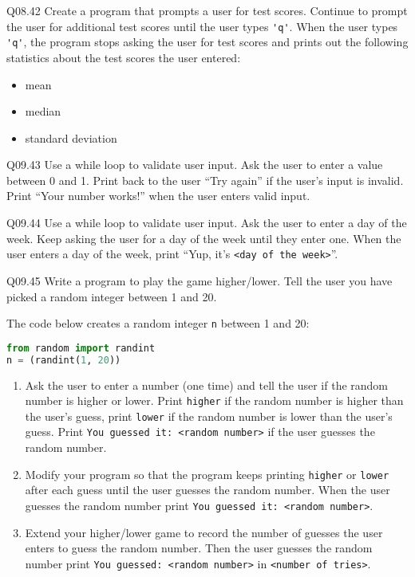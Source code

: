 \documentclass{book}
\providecommand{\tightlist}{%
      \setlength{\itemsep}{0pt}\setlength{\parskip}{0pt}}
\newcommand{\passthrough}[1]{#1}
\begin{document}
Q08.42 Create a program that prompts a user for test scores. Continue to
prompt the user for additional test scores until the user types
\passthrough{\lstinline!'q'!}. When the user types
\passthrough{\lstinline!'q'!}, the program stops asking the user for
test scores and prints out the following statistics about the test
scores the user entered:

\begin{itemize}
\tightlist
\item
  mean
\item
  median
\item
  standard deviation
\end{itemize}

Q09.43 Use a while loop to validate user input. Ask the user to enter a
value between 0 and 1. Print back to the user ``Try again'' if the
user's input is invalid. Print ``Your number works!'' when the user
enters valid input.

Q09.44 Use a while loop to validate user input. Ask the user to enter a
day of the week. Keep asking the user for a day of the week until they
enter one. When the user enters a day of the week, print ``Yup, it's
\passthrough{\lstinline!<day of the week>!}''.

Q09.45 Write a program to play the game higher/lower. Tell the user you
have picked a random integer between 1 and 20.

The code below creates a random integer \passthrough{\lstinline!n!}
between 1 and 20:

\begin{lstlisting}[language=Python]
from random import randint
n = (randint(1, 20))
\end{lstlisting}

\begin{enumerate}
\def\labelenumi{(\alph{enumi})}
\item
  Ask the user to enter a number (one time) and tell the user if the
  random number is higher or lower. Print
  \passthrough{\lstinline!higher!} if the random number is higher than
  the user's guess, print \passthrough{\lstinline!lower!} if the random
  number is lower than the user's guess. Print
  \passthrough{\lstinline!You guessed it: <random number>!} if the user
  guesses the random number.
\item
  Modify your program so that the program keeps printing
  \passthrough{\lstinline!higher!} or \passthrough{\lstinline!lower!}
  after each guess until the user guesses the random number. When the
  user guesses the random number print
  \passthrough{\lstinline!You guessed it: <random number>!}.
\item
  Extend your higher/lower game to record the number of guesses the user
  enters to guess the random number. Then the user guesses the random
  number print \passthrough{\lstinline!You guessed: <random number>!} in
  \passthrough{\lstinline!<number of tries>!}.
\end{enumerate}
\end{document}
